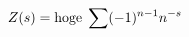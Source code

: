 \documentclass{article}
\begin{document}
\[
\color[rgb]{0.000,0.000,0.000} {
Z(s) = \text{hoge}\; \sum (-1)^{n-1}n^{-s}}
\]
\end{document}

